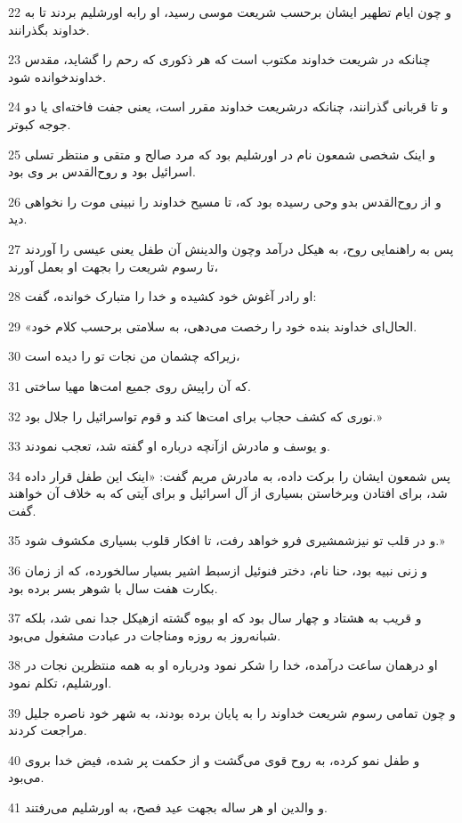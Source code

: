 \par 22 و چون ایام تطهیر ایشان برحسب شریعت موسی رسید، او رابه اورشلیم بردند تا به خداوند بگذرانند.
\par 23 چنانکه در شریعت خداوند مکتوب است که هر ذکوری که رحم را گشاید، مقدس خداوندخوانده شود.
\par 24 و تا قربانی گذرانند، چنانکه درشریعت خداوند مقرر است، یعنی جفت فاخته‌ای یا دو جوجه کبوتر.
\par 25 و اینک شخصی شمعون نام در اورشلیم بود که مرد صالح و متقی و منتظر تسلی اسرائیل بود و روح‌القدس بر وی بود.
\par 26 و از روح‌القدس بدو وحی رسیده بود که، تا مسیح خداوند را نبینی موت را نخواهی دید.
\par 27 پس به راهنمایی روح، به هیکل درآمد وچون والدینش آن طفل یعنی عیسی را آوردند تا رسوم شریعت را بجهت او بعمل آورند،
\par 28 او رادر آغوش خود کشیده و خدا را متبارک خوانده، گفت:
\par 29 «الحال‌ای خداوند بنده خود را رخصت می‌دهی، به سلامتی برحسب کلام خود.
\par 30 زیراکه چشمان من نجات تو را دیده است،
\par 31 که آن راپیش روی جمیع امت‌ها مهیا ساختی.
\par 32 نوری که کشف حجاب برای امت‌ها کند و قوم تواسرائیل را جلال بود.»
\par 33 و یوسف و مادرش ازآنچه درباره او گفته شد، تعجب نمودند.
\par 34 پس شمعون ایشان را برکت داده، به مادرش مریم گفت: «اینک این طفل قرار داده شد، برای افتادن وبرخاستن بسیاری از آل اسرائیل و برای آیتی که به خلاف آن خواهند گفت.
\par 35 و در قلب تو نیزشمشیری فرو خواهد رفت، تا افکار قلوب بسیاری مکشوف شود.»
\par 36 و زنی نبیه بود، حنا نام، دختر فنوئیل ازسبط اشیر بسیار سالخورده، که از زمان بکارت هفت سال با شوهر بسر برده بود.
\par 37 و قریب به هشتاد و چهار سال بود که او بیوه گشته ازهیکل جدا نمی شد، بلکه شبانه‌روز به روزه ومناجات در عبادت مشغول می‌بود.
\par 38 او درهمان ساعت در‌آمده، خدا را شکر نمود ودرباره او به همه منتظرین نجات در اورشلیم، تکلم نمود.
\par 39 و چون تمامی رسوم شریعت خداوند را به پایان برده بودند، به شهر خود ناصره جلیل مراجعت کردند.
\par 40 و طفل نمو کرده، به روح قوی می‌گشت و از حکمت پر شده، فیض خدا بروی می‌بود.
\par 41 و والدین او هر ساله بجهت عید فصح، به اورشلیم می‌رفتند.
